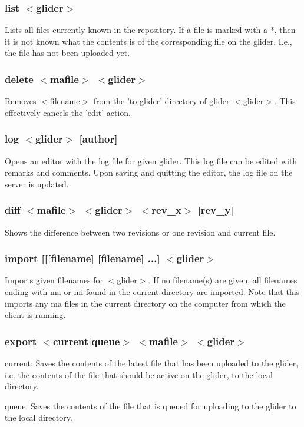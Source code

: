 \documentclass{article}
\begin{document}
\subsubsection*{list $<$glider$>$}
Lists all files currently known in the repository. If a file is marked
with a *, then it is not known what the contents is of the corresponding
file on the glider. I.e., the file has not been uploaded yet.

\subsubsection*{delete $<$mafile$>$ $<$glider$>$}
Removes $<$filename$>$ from the 'to-glider' directory of glider $<$glider$>$.
This effectively cancels the 'edit' action.

\subsubsection*{log $<$glider$>$ [author]}
Opens an editor with the log file for given glider. This log file can
be edited with remarks and comments. Upon saving and quitting the
editor, the log file on the server is updated.
\subsubsection*{diff $<$mafile$>$ $<$glider$>$ $<$rev\_x$>$ [rev\_y]}
Shows the difference between two revisions or one revision and current
file.

\subsubsection*{import [[[filename] [filename] ...] $<$glider$>$}
Imports given filenames for $<$glider$>$. If no filename(s) are given, 
all filenames ending with ma or mi found in the current directory are
imported. Note that this imports any ma files in the current directory
on the computer from which the client is running.

\subsubsection*{export $<$current|queue$>$ $<$mafile$>$ $<$glider$>$}
current:
  Saves the contents of the latest file that has been uploaded to the 
  glider, i.e. the contents of the file that should be active on the
  glider, to the local directory.

\noindent queue:
  Saves the contents of the file that is queued for uploading to the glider
  to the local directory.
\end{document}
